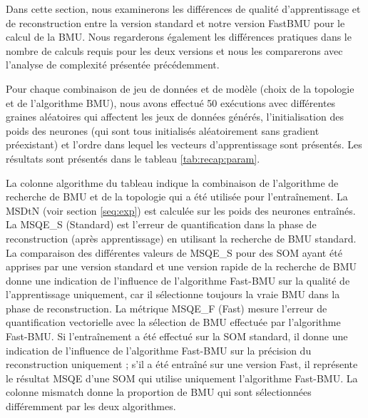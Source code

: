	Dans cette section, nous examinerons les différences de qualité d'apprentissage et de reconstruction entre la version standard et notre version FastBMU pour le calcul de la BMU. Nous regarderons également les différences pratiques dans le nombre de calculs requis pour les deux versions et nous les comparerons avec l'analyse de complexité présentée précédemment.

	Pour chaque combinaison de jeu de données et de modèle (choix de la topologie et de l'algorithme BMU), nous avons effectué 50 exécutions avec différentes graines aléatoires qui affectent les jeux de données générés, l'initialisation des poids des neurones (qui sont tous initialisés aléatoirement sans gradient préexistant) et l'ordre dans lequel les vecteurs d'apprentissage sont présentés. Les résultats sont présentés dans le tableau \ref{tab:recap:param}.

	La colonne algorithme du tableau indique la combinaison de l'algorithme de recherche de BMU et de la topologie qui a été utilisée pour l'entraînement. La MSDtN (voir section \ref{seq:exp}) est calculée sur les poids des neurones entraînés. La MSQE\_S (Standard) est l'erreur de quantification dans la phase de reconstruction (après apprentissage) en utilisant la recherche de BMU standard. La comparaison des différentes valeurs de MSQE\_S pour des SOM ayant été apprises par une version standard et une version rapide de la recherche de BMU donne une indication de l'influence de l'algorithme Fast-BMU sur la qualité de l'apprentissage uniquement, car il sélectionne toujours la vraie BMU dans la phase de reconstruction. La métrique MSQE\_F (Fast) mesure l'erreur de quantification vectorielle avec la sélection de BMU effectuée par l'algorithme Fast-BMU. Si l'entraînement a été effectué sur la SOM standard, il donne une indication de l'influence de l'algorithme Fast-BMU sur la précision du reconstruction uniquement ; s'il a été entraîné sur une version Fast, il représente le résultat MSQE d'une SOM qui utilise uniquement l'algorithme Fast-BMU. La colonne mismatch donne la proportion de BMU qui sont sélectionnées différemment par les deux algorithmes.

